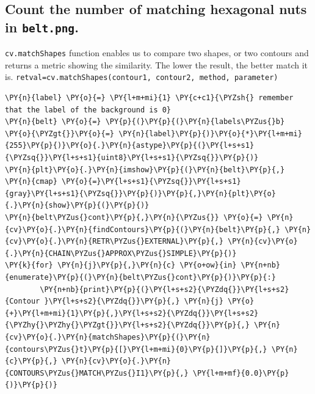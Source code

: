 \documentclass[a4paper,11pt]{article}%
\begin{document}
    \hypertarget{count-the-number-of-matching-hexagonal-nuts-in-belt.png.}{%
\subsection{\texorpdfstring{Count the number of matching hexagonal
nuts in
\texttt{belt.png}.}{Count the number of matching hexagonal nuts in belt.png.}}\label{count-the-number-of-matching-hexagonal-nuts-in-belt.png.}}

\texttt{cv.matchShapes} function enables us to compare two shapes, or
two contours and returns a metric showing the similarity. The lower the
result, the better match it is.
\texttt{retval=cv.matchShapes(contour1,\ contour2,\ method,\ parameter)}

    \begin{tcolorbox}[breakable, size=fbox, boxrule=1pt, pad at break*=1mm,colback=cellbackground, colframe=cellborder]
\begin{Verbatim}[commandchars=\\\{\}]
\PY{n}{label} \PY{o}{=} \PY{l+m+mi}{1} \PY{c+c1}{\PYZsh{} remember that the label of the background is 0}
\PY{n}{belt} \PY{o}{=} \PY{p}{(}\PY{p}{(}\PY{n}{labels\PYZus{}b} \PY{o}{\PYZgt{}}\PY{o}{=} \PY{n}{label}\PY{p}{)}\PY{o}{*}\PY{l+m+mi}{255}\PY{p}{)}\PY{o}{.}\PY{n}{astype}\PY{p}{(}\PY{l+s+s1}{\PYZsq{}}\PY{l+s+s1}{uint8}\PY{l+s+s1}{\PYZsq{}}\PY{p}{)}
\PY{n}{plt}\PY{o}{.}\PY{n}{imshow}\PY{p}{(}\PY{n}{belt}\PY{p}{,} \PY{n}{cmap} \PY{o}{=}\PY{l+s+s1}{\PYZsq{}}\PY{l+s+s1}{gray}\PY{l+s+s1}{\PYZsq{}}\PY{p}{)}\PY{p}{,}\PY{n}{plt}\PY{o}{.}\PY{n}{show}\PY{p}{(}\PY{p}{)}
\PY{n}{belt\PYZus{}cont}\PY{p}{,}\PY{n}{\PYZus{}} \PY{o}{=} \PY{n}{cv}\PY{o}{.}\PY{n}{findContours}\PY{p}{(}\PY{n}{belt}\PY{p}{,} \PY{n}{cv}\PY{o}{.}\PY{n}{RETR\PYZus{}EXTERNAL}\PY{p}{,} \PY{n}{cv}\PY{o}{.}\PY{n}{CHAIN\PYZus{}APPROX\PYZus{}SIMPLE}\PY{p}{)}
\PY{k}{for} \PY{n}{j}\PY{p}{,}\PY{n}{c} \PY{o+ow}{in} \PY{n+nb}{enumerate}\PY{p}{(}\PY{n}{belt\PYZus{}cont}\PY{p}{)}\PY{p}{:}
        \PY{n+nb}{print}\PY{p}{(}\PY{l+s+s2}{\PYZdq{}}\PY{l+s+s2}{Contour }\PY{l+s+s2}{\PYZdq{}}\PY{p}{,} \PY{n}{j} \PY{o}{+}\PY{l+m+mi}{1}\PY{p}{,}\PY{l+s+s2}{\PYZdq{}}\PY{l+s+s2}{\PYZhy{}\PYZhy{}\PYZgt{}}\PY{l+s+s2}{\PYZdq{}}\PY{p}{,} \PY{n}{cv}\PY{o}{.}\PY{n}{matchShapes}\PY{p}{(}\PY{n}{contours\PYZus{}t}\PY{p}{[}\PY{l+m+mi}{0}\PY{p}{]}\PY{p}{,} \PY{n}{c}\PY{p}{,} \PY{n}{cv}\PY{o}{.}\PY{n}{CONTOURS\PYZus{}MATCH\PYZus{}I1}\PY{p}{,} \PY{l+m+mf}{0.0}\PY{p}{)}\PY{p}{)}
\end{Verbatim}
\end{tcolorbox}
\end{document}
